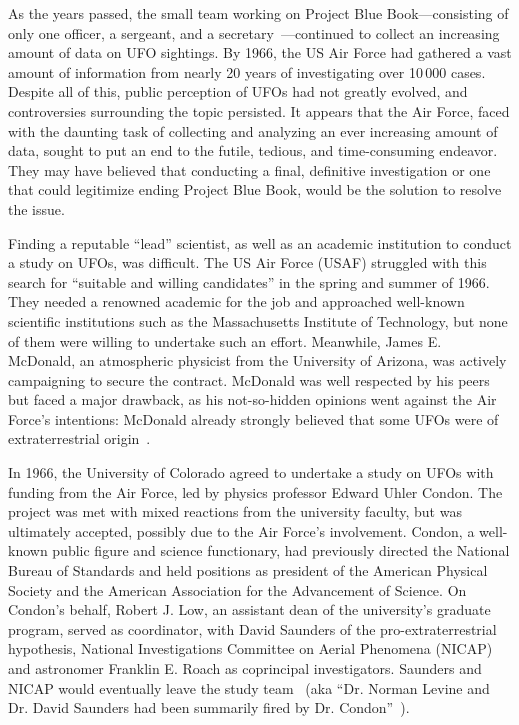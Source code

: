As the years passed, the small team working on Project Blue Book---consisting of only one officer,
a sergeant, and a secretary~\cite{Condon-report,Condon-report-Bantam,Condon-report-Dutton,BibEntry2023Jan}---continued to collect
an increasing amount of data on UFO sightings. By 1966, the US Air Force had gathered a vast amount of information from nearly 20
years of investigating over 10\,000 cases.
Despite all of this,
public perception of UFOs had not greatly evolved, and controversies surrounding the topic persisted.
It appears that the Air Force, faced with the daunting task of collecting and analyzing an ever increasing amount of data,
sought to put an end to the futile, tedious, and time-consuming endeavor.
They may have believed that conducting a final, definitive investigation or one that
could legitimize ending Project Blue Book, would be the solution to resolve the issue.

Finding a reputable ``lead'' scientist, as well as an academic institution to conduct a study on UFOs, was
difficult. The US Air Force (USAF) struggled with this search for ``suitable and willing candidates''
in the spring and summer of 1966.
They needed a renowned academic for the job and approached well-known scientific institutions such as
the Massachusetts Institute of Technology, but none of them were willing to undertake such an effort. Meanwhile, James E. McDonald, an atmospheric physicist from the University of Arizona, was actively campaigning to secure the contract. McDonald was well respected by his peers but faced a major drawback, as his not-so-hidden opinions went against the Air Force's intentions: McDonald already strongly believed that some UFOs were of extraterrestrial origin~\cite{Klass2019Apr}.

In 1966, the University of Colorado agreed to undertake a study on UFOs with funding from the Air Force,
led by physics professor Edward Uhler Condon. The project was met with mixed reactions from the university faculty,
but was ultimately accepted, possibly due to the Air Force's involvement.
Condon, a well-known public figure and science functionary, had previously directed the National Bureau of Standards
and held positions as president of the American Physical Society and the American Association for the Advancement of Science.
On Condon's behalf, Robert J. Low, an assistant dean of the university's graduate program,
served as coordinator, with David Saunders of the pro-extraterrestrial hypothesis,
National Investigations Committee on Aerial Phenomena (NICAP) and astronomer Franklin E. Roach as coprincipal investigators.
Saunders and NICAP would eventually leave the study team~\cite{Saunders1968Jan}
(aka ``Dr. Norman Levine and Dr. David Saunders had been summarily fired by Dr. Condon''~\cite[Chapter~11, p.~199]{CraigCondon1995}).

